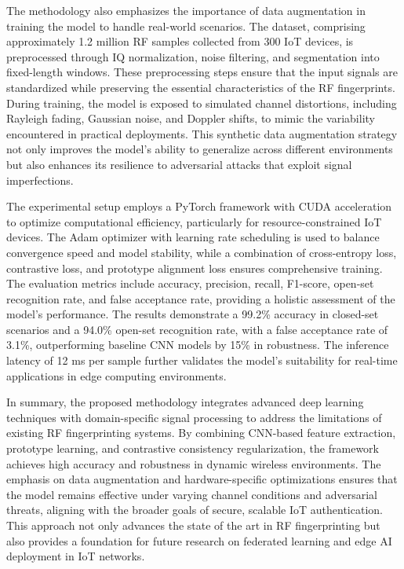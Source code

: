 \documentclass[conference]{IEEEtran}
\begin{document}
The methodology also emphasizes the importance of data augmentation in training the model to handle real-world scenarios. The dataset, comprising approximately 1.2 million RF samples collected from 300 IoT devices, is preprocessed through IQ normalization, noise filtering, and segmentation into fixed-length windows. These preprocessing steps ensure that the input signals are standardized while preserving the essential characteristics of the RF fingerprints. During training, the model is exposed to simulated channel distortions, including Rayleigh fading, Gaussian noise, and Doppler shifts, to mimic the variability encountered in practical deployments. This synthetic data augmentation strategy not only improves the model's ability to generalize across different environments but also enhances its resilience to adversarial attacks that exploit signal imperfections.

The experimental setup employs a PyTorch framework with CUDA acceleration to optimize computational efficiency, particularly for resource-constrained IoT devices. The Adam optimizer with learning rate scheduling is used to balance convergence speed and model stability, while a combination of cross-entropy loss, contrastive loss, and prototype alignment loss ensures comprehensive training. The evaluation metrics include accuracy, precision, recall, F1-score, open-set recognition rate, and false acceptance rate, providing a holistic assessment of the model's performance. The results demonstrate a 99.2\% accuracy in closed-set scenarios and a 94.0\% open-set recognition rate, with a false acceptance rate of 3.1\%, outperforming baseline CNN models by 15\% in robustness. The inference latency of 12 ms per sample further validates the model's suitability for real-time applications in edge computing environments.

In summary, the proposed methodology integrates advanced deep learning techniques with domain-specific signal processing to address the limitations of existing RF fingerprinting systems. By combining CNN-based feature extraction, prototype learning, and contrastive consistency regularization, the framework achieves high accuracy and robustness in dynamic wireless environments. The emphasis on data augmentation and hardware-specific optimizations ensures that the model remains effective under varying channel conditions and adversarial threats, aligning with the broader goals of secure, scalable IoT authentication. This approach not only advances the state of the art in RF fingerprinting but also provides a foundation for future research on federated learning and edge AI deployment in IoT networks.
\end{document}
